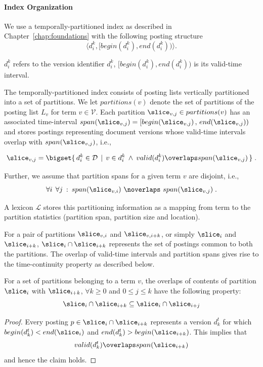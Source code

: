 \paragraph{Index Organization}

We use a temporally-partitioned index as described in Chapter~\ref{chap:foundations} with the following posting structure 
$$
  \langle d_i^k, [begin(d_i^{k}), end(d_i^{k}))\rangle.
$$

 $d_i^k$ refers to the version identifier $d_i^{k}$, $[begin(d_i^{k}), end(d_i^{k}))$ is its valid-time interval.

The temporally-partitioned index consists of posting lists vertically partitioned into a set of partitions. We let $partitions(v)$ denote the set of partitions of the posting list $L_v$ for term $v \in \mathcal{V}$. Each partition $\slice_{v,j} \in partitions(v)$ has an associated time-interval $span(\slice_{v,j}) = [begin(\slice_{v,j})\,,\, end(\slice_{v,j}))$ and stores postings representing document versions whose valid-time intervals overlap with $span(\slice_{v,j}) $, i.e.,

\begin{equation*}
  \slice_{v,j} = \bigset{ \, d_i^k \in \mathcal{D} \:\:|\:\: v \in d_i^k \:\wedge\: valid(d_i^k) \overlaps span(\slice_{v,j})\,} \;.
\end{equation*}

Further, we assume that partition spans for a given term $v$ are disjoint, i.e.,
\begin{equation*}
  \forall{i}\:\:\forall{j}\::\: span(\slice_{v,i})\,\, \noverlaps \,\,span(\slice_{v,j})\;.
\end{equation*}

A lexicon $\mathcal{L}$ stores this partitioning information as a mapping from term to the partition statistics (partition span, partition size and location).

For a pair of partitions $\slice_{v,i}$ and $\slice_{v,i+k}$, or simply $\slice_{i}$ and $\slice_{i+k}$, $\slice_{i} \cap \slice_{i+k}$ represents the set of postings common to both the partitions. The overlap of valid-time intervals and partition spans gives rise to the time-continuity property as described below. 
\begin {lemma}
  \label{lem:eff}
  For a set of partitions belonging to a term $v$, the overlaps of contents of partition $\slice_{i}$ with
  $\slice_{i+k}$, $\forall k \geq 0$ and $0 \leq j \leq k$ have the following property:
$$
  \slice_{i} \cap \slice_{i+k} \subseteq \slice_{i} \cap \slice_{i+j}
$$
\end{lemma}
\begin{proof}{}
  Every posting $p \in \slice_{i} \cap \slice_{i+k}$ represents a version $d_k^t $ for which $begin(d_k^t) < end(\slice_i)$ and $end(d_k^t) > begin(\slice_{i+k})$. This implies that 
  $$
    valid(d_k^t) \overlaps span(\slice_{i+k} )
  $$
   and hence the claim holds.
\end{proof}

